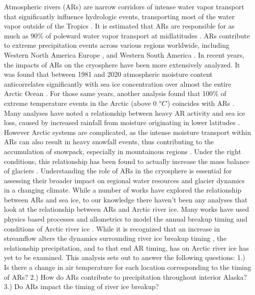 \documentclass[draft]{AR_analysis_}
\begin{document}
Atmospheric rivers (ARs) are narrow corridors of intense water vapor
transport that significantly influence hydrologic events, transporting
most of the water vapor outside of the Tropics \cite{NOAA_AR_summary}.
It is estimated that ARs are responsible for as much as 90\% of poleward
water vapor transport at midlatitudes \cite{other_alg}. ARs contribute to
extreme precipitation events across various regions worldwide, including
Western North America \cite{Dettinger2004, Neiman2008, Guan2010,
ARs_flood_WA_State, ARs_flood_Russian_River_CA, Ralph2013, ARs_CA}
Europe \cite{Lavers2013, ARs_impact_Norway}, and Western South America
\cite{ARs_impact_SA}. In recent years, the impacts of ARs on the
cryosphere have been more extensively analyzed. It was found that between
1981 and 2020 atmospheric moisture content anticorrelates significantly
with sea ice concentration over almost the entire Arctic Ocean
\cite{ARs_lead_to_sea_ice_loss}. For those same years, another analysis
found that 100\% of extreme temperature events in the Arctic (above 0
$\degree C$) coincides with ARs \cite{Ma2023}. Many analyses have noted
a relationship between heavy AR activity and sea ice loss, caused by
increased rainfall from moisture originating in lower latitudes
\cite{Zhang2023, maclennan_contribution_2022}. However Arctic systems
are complicated, as the intense moisture transport within ARs can also
result in heavy snowfall events, thus contributing to the accumulation
of snowpack, especially in mountainous regions \cite{Saavedra2020,
Guan2010}. Under the right conditions, this relationship has been found
to actually increase the mass balance of glaciers \cite{Little2019}.
Understanding the role of ARs in the cryosphere is essential for
assessing their broader impact on regional water resources and glacier
dynamics in a changing climate. While a number of works have explored
the relationship between ARs and sea ice, to our knowledge there haven't
been any analyses that look at the relationship between ARs and Arctic
river ice. Many works have used physics based processes and allometrics
to model the annual breakup timing and conditions of Arctic river ice
\cite{Paily, ashton1986river, Prowse_Bonsal_Duguay_Lacroix_2007,
jasek1998, shen_newest}. While it is recognized that an increase in
streamflow alters the dynamics surrounding river ice breakup timing
\cite{ashton1986river}, the relationship precipitation, and to that end
AR timing, has on Arctic river ice has yet to be examined. This analysis
sets out to answer the following questions: 1.) Is there a change in
air temperature for each location corresponding to the timing of ARs?
2.) How do ARs contribute to precipitation throughout interior Alaska?
3.) Do ARs impact the timing of river ice breakup?
\end{document}

